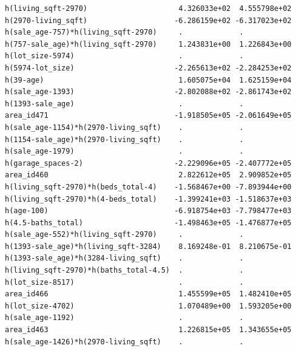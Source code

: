 \documentclass[
]{article}
\begin{document}
\begin{verbatim}
h(living_sqft-2970)                     4.326033e+02  4.555798e+02
h(2970-living_sqft)                    -6.286159e+02 -6.317023e+02
h(sale_age-757)*h(living_sqft-2970)     .             .           
h(757-sale_age)*h(living_sqft-2970)     1.243831e+00  1.226843e+00
h(lot_size-5974)                        .             .           
h(5974-lot_size)                       -2.265613e+02 -2.284253e+02
h(39-age)                               1.605075e+04  1.625159e+04
h(sale_age-1393)                       -2.802088e+02 -2.861743e+02
h(1393-sale_age)                        .             .           
area_id471                             -1.918505e+05 -2.061649e+05
h(sale_age-1154)*h(2970-living_sqft)    .             .           
h(1154-sale_age)*h(2970-living_sqft)    .             .           
h(sale_age-1979)                        .             .           
h(garage_spaces-2)                     -2.229096e+05 -2.407772e+05
area_id460                              2.822612e+05  2.909852e+05
h(living_sqft-2970)*h(beds_total-4)    -1.568467e+00 -7.893944e+00
h(living_sqft-2970)*h(4-beds_total)    -1.399241e+03 -1.518637e+03
h(age-100)                             -6.918754e+03 -7.798477e+03
h(4.5-baths_total)                     -1.498463e+05 -1.476877e+05
h(sale_age-552)*h(living_sqft-2970)     .             .           
h(1393-sale_age)*h(living_sqft-3284)    8.169248e-01  8.210675e-01
h(1393-sale_age)*h(3284-living_sqft)    .             .           
h(living_sqft-2970)*h(baths_total-4.5)  .             .           
h(lot_size-8517)                        .             .           
area_id466                              1.455599e+05  1.482410e+05
h(lot_size-4702)                        1.070489e+00  1.593205e+00
h(sale_age-1192)                        .             .           
area_id463                              1.226815e+05  1.343655e+05
h(sale_age-1426)*h(2970-living_sqft)    .             .           
                                                                  

\end{verbatim}
\end{document}
